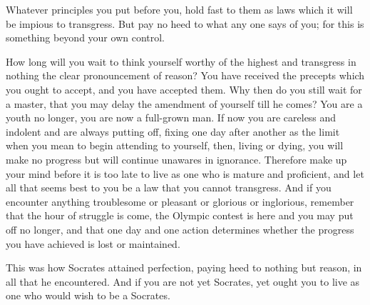 Whatever principles you put before you, hold fast to them as laws which it will
be impious to transgress. But pay no heed to what any one says of you; for this
is something beyond your own control.

How long will you  wait to think yourself worthy of  the highest and transgress
in nothing  the clear pronouncement of  reason? You have received  the precepts
which you ought  to accept, and you  have accepted them. Why then  do you still
wait for a master, that you may  delay the amendment of yourself till he comes?
You  are a  youth no  longer, you  are now  a full-grown  man. If  now you  are
careless and indolent and are always  putting off, fixing one day after another
as the  limit when  you mean to  begin attending to  yourself, then,  living or
dying,  you will  make no  progress but  will continue  unawares in  ignorance.
Therefore make up your mind before it is  too late to live as one who is mature
and proficient,  and let all that  seems best to you  be a law that  you cannot
transgress. And if  you encounter anything troublesome or  pleasant or glorious
or inglorious, remember that the hour  of struggle is come, the Olympic contest
is  here and  you may  put  off no  longer, and  that  one day  and one  action
determines whether the progress you have achieved is lost or maintained.

This was how  Socrates attained perfection, paying heed to  nothing but reason,
in all that he  encountered. And if you are not yet Socrates,  yet ought you to
live as one who would wish to be a Socrates.
